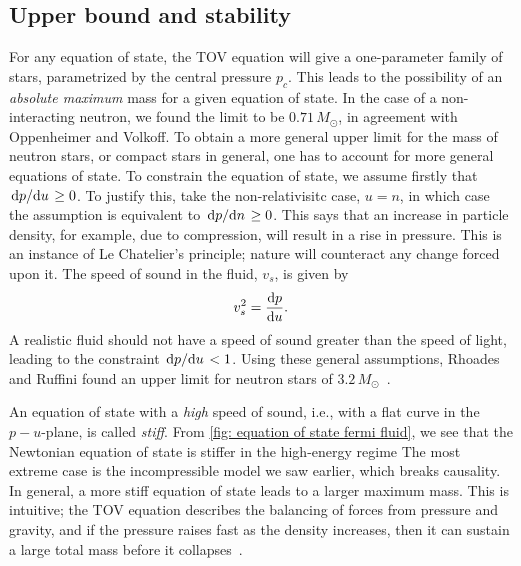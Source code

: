 
\subsection{Upper bound and stability}


For any equation of state, the TOV equation will give a one-parameter family of stars, parametrized by the central pressure $p_c$.
This leads to the possibility of an \emph{absolute maximum} mass for a given equation of state.
In the case of a non-interacting neutron, we found the limit to be $0.71 \, M_\odot$, in agreement with Oppenheimer and Volkoff.
To obtain a more general upper limit for the mass of neutron stars, or compact stars in general, one has to account for more general equations of state.
To constrain the equation of state, we assume firstly that $\odv{p}/{u} \geq 0$.
To justify this, take the non-relativisitc case, $u = n$, in which case the assumption is equivalent to $\odv{p}/{n} \geq 0$.
This says that an increase in particle density, for example, due to compression, will result in a rise in pressure.
This is an instance of Le Chatelier's principle; nature will counteract any change forced upon it.
The speed of sound in the fluid, $v_s$, is given by~\autocite{weinbergGravitationCosmologyPrinciples1972}
%
\begin{equation}
    v_s^2 = \odv{p}{u}.
\end{equation}
%
A realistic fluid should not have a speed of sound greater than the speed of light, leading to the constraint $\odv{p}/{u} < 1$.
Using these general assumptions, Rhoades and Ruffini found an upper limit for neutron stars of $3.2 \, M_\odot$~\cite{rhoadesMaximumMassNeutron1974}.

An equation of state with a \emph{high} speed of sound, i.e., with a flat curve in the $p-u$-plane, is called \emph{stiff}.
From \autoref{fig: equation of state fermi fluid}, we see that the Newtonian equation of state is stiffer in the high-energy regime
The most extreme case is the incompressible model we saw earlier, which breaks causality.
In general, a more stiff equation of state leads to a larger maximum mass.
This is intuitive; the TOV equation describes the balancing of forces from pressure and gravity, and if the pressure raises fast as the density increases, then it can sustain a large total mass before it collapses~\autocite{glendenningCompactStarsNuclear2012}.


